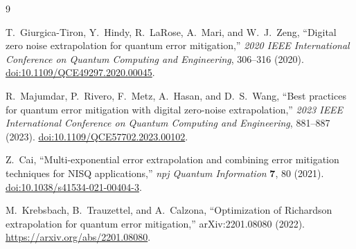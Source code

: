 \documentclass[11pt]{article}
\begin{document}
\begin{thebibliography}{9}

T.~Giurgica-Tiron, Y.~Hindy, R.~LaRose, A.~Mari, and W.~J.~Zeng,
``Digital zero noise extrapolation for quantum error mitigation,''
\emph{2020 IEEE International Conference on Quantum Computing and
Engineering}, 306--316 (2020).
\href{https://doi.org/10.1109/QCE49297.2020.00045}
{doi:10.1109/QCE49297.2020.00045}.

R.~Majumdar, P.~Rivero, F.~Metz, A.~Hasan, and D.~S.~Wang,
``Best practices for quantum error mitigation with digital zero-noise
extrapolation,'' \emph{2023 IEEE International Conference on Quantum
Computing and Engineering}, 881--887 (2023).
\href{https://doi.org/10.1109/QCE57702.2023.00102}
{doi:10.1109/QCE57702.2023.00102}.

Z.~Cai,
``Multi-exponential error extrapolation and combining error mitigation
techniques for NISQ applications,'' \emph{npj Quantum Information}
\textbf{7}, 80 (2021).
\href{https://doi.org/10.1038/s41534-021-00404-3}
{doi:10.1038/s41534-021-00404-3}.

M.~Krebsbach, B.~Trauzettel, and A.~Calzona,
``Optimization of Richardson extrapolation for quantum error mitigation,''
arXiv:2201.08080 (2022). \url{https://arxiv.org/abs/2201.08080}.

\end{thebibliography}
\end{document}

